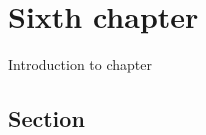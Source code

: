 \chapter{Sixth chapter}
\label{chap:sixth-chapter}
Introduction to chapter

\section{Section}
\label{sec:sixth-section}

\newpage